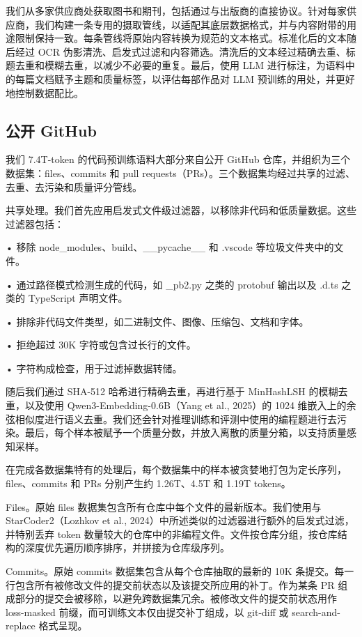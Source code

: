 \documentclass[
  10
]{article}
\begin{document}
我们从多家供应商处获取图书和期刊，包括通过与出版商的直接协议。针对每家供应商，我们构建一条专用的摄取管线，以适配其底层数据格式，并与内容附带的用途限制保持一致。每条管线将原始内容转换为规范的文本格式。标准化后的文本随后经过 OCR 伪影清洗、启发式过滤和内容筛选。清洗后的文本经过精确去重、标题去重和模糊去重，以减少不必要的重复。最后，使用 LLM 进行标注，为语料中的每篇文档赋予主题和质量标签，以评估每部作品对 LLM 预训练的用处，并更好地控制数据配比。

\subsection{公开 GitHub}\label{b.4-public-github}

我们 7.4T-token 的代码预训练语料大部分来自公开 GitHub 仓库，并组织为三个数据集：files、commits 和 pull requests（PRs）。三个数据集均经过共享的过滤、去重、去污染和质量评分管线。

共享处理。我们首先应用启发式文件级过滤器，以移除非代码和低质量数据。这些过滤器包括：

• 移除 node\_modules、build、\_\_pycache\_\_ 和 .vscode 等垃圾文件夹中的文件。

• 通过路径模式检测生成的代码，如 \_pb2.py 之类的 protobuf 输出以及 .d.ts 之类的 TypeScript 声明文件。

• 排除非代码文件类型，如二进制文件、图像、压缩包、文档和字体。

• 拒绝超过 30K 字符或包含过长行的文件。

• 字符构成检查，用于过滤掉数据转储。

随后我们通过 SHA-512 哈希进行精确去重，再进行基于 MinHashLSH 的模糊去重，以及使用 Qwen3-Embedding-0.6B（Yang et al., 2025）的 1024 维嵌入上的余弦相似度进行语义去重。我们还会针对推理训练和评测中使用的编程题进行去污染。最后，每个样本被赋予一个质量分数，并放入离散的质量分箱，以支持质量感知采样。

在完成各数据集特有的处理后，每个数据集中的样本被贪婪地打包为定长序列，files、commits 和 PRs 分别产生约 1.26T、4.5T 和 1.19T tokens。

Files。原始 files 数据集包含所有仓库中每个文件的最新版本。我们使用与 StarCoder2（Lozhkov et al., 2024）中所述类似的过滤器进行额外的启发式过滤，并特别丢弃 token 数量较大的仓库中的非编程文件。文件按仓库分组，按仓库结构的深度优先遍历顺序排序，并拼接为仓库级序列。

Commits。原始 commits 数据集包含从每个仓库抽取的最新的 10K 条提交。每一行包含所有被修改文件的提交前状态以及该提交所应用的补丁。作为某条 PR 组成部分的提交会被移除，以避免跨数据集冗余。被修改文件的提交前状态用作 loss-masked 前缀，而可训练文本仅由提交补丁组成，以 git-diff 或 search-and-replace 格式呈现。
\end{document}
